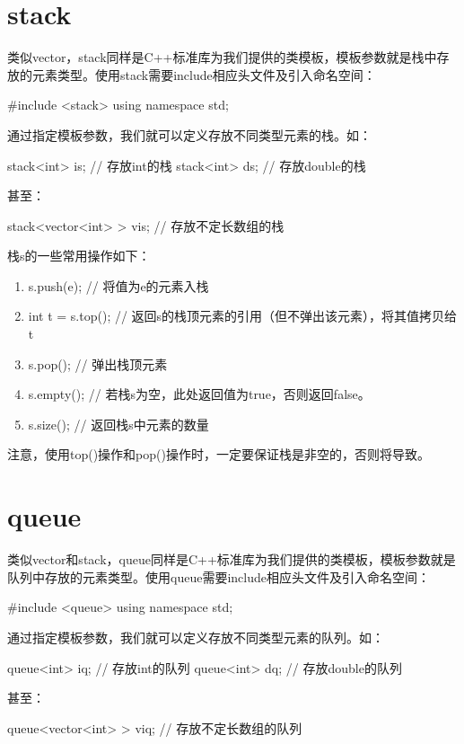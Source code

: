\section*{stack}
类似vector，stack同样是C++标准库为我们提供的类模板，模板参数就是栈中存放的元素类型。使用stack需要include相应头文件及引入命名空间：
\begin{cppcode}
    #include <stack>
    using namespace std;
\end{cppcode}

通过指定模板参数，我们就可以定义存放不同类型元素的栈。如：
\begin{cppcode}
    stack<int> is;  // 存放int的栈
    stack<int> ds;  // 存放double的栈
\end{cppcode}
甚至：
\begin{cppcode}
    stack<vector<int> > vis;    // 存放不定长数组的栈
\end{cppcode}

栈s的一些常用操作如下：
\begin{enumerate}[label=\arabic*）]
    \item s.push(e);    // 将值为e的元素入栈
    \item int t = s.top();      // 返回s的栈顶元素的引用（但不弹出该元素），将其值拷贝给t
    \item s.pop();      // 弹出栈顶元素
    \item s.empty();    // 若栈s为空，此处返回值为true，否则返回false。
    \item s.size();     // 返回栈s中元素的数量
\end{enumerate}

注意，使用top()操作和pop()操作时，一定要保证栈是非空的，否则将导致。


\section*{queue}
类似vector和stack，queue同样是C++标准库为我们提供的类模板，模板参数就是队列中存放的元素类型。使用queue需要include相应头文件及引入命名空间：
\begin{cppcode}
    #include <queue>
    using namespace std;
\end{cppcode}

通过指定模板参数，我们就可以定义存放不同类型元素的队列。如：
\begin{cppcode}
    queue<int> iq;  // 存放int的队列
    queue<int> dq;  // 存放double的队列
\end{cppcode}
甚至：
\begin{cppcode}
    queue<vector<int> > viq;    // 存放不定长数组的队列
\end{cppcode}

